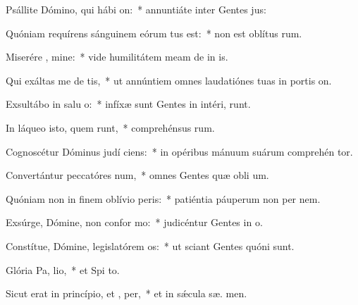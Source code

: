 \item Psállite Dómino, qui hábi  on:~* annuntiáte inter Gentes  jus:
\item Quóniam requírens sánguinem eórum tus est:~* non est oblítus  rum.
\item Miserére , mine:~* vide humilitátem meam de in is.
\item Qui exáltas me de  tis,~* ut annúntiem omnes laudatiónes tuas in portis  on.
\item Exsultábo in salu o:~* infíxæ sunt Gentes in intéri,  runt.
\item In láqueo isto, quem runt,~* comprehénsus   rum.
\item Cognoscétur Dóminus judí ciens:~* in opéribus mánuum suárum comprehén  tor.
\item Convertántur peccatóres  num,~* omnes Gentes quæ obli um.
\item Quóniam non in finem oblívio  peris:~* patiéntia páuperum non per  nem.
\item Exsúrge, Dómine, non confor mo:~* judicéntur Gentes in  o.
\item Constítue, Dómine, legislatórem  os:~* ut sciant Gentes quóni  sunt.
\item Glória Pa,  lio,~* et Spi to.
\item Sicut erat in princípio, et ,  per,~* et in sǽcula sæ. men.

